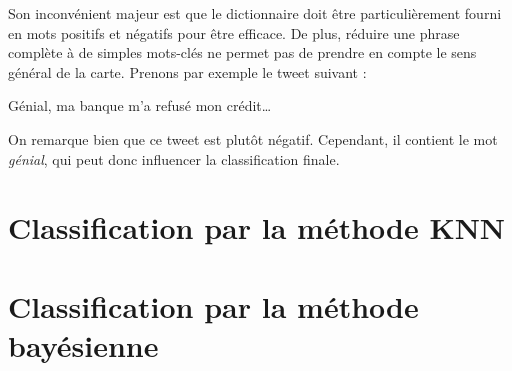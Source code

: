 \documentclass[12pt,a4paper]{report}
\begin{document}
Son inconvénient majeur est que le dictionnaire doit être particulièrement
fourni en mots positifs et négatifs pour être efficace. De plus, réduire une
phrase complète à de simples mots-clés ne permet pas de prendre en compte le
sens général de la carte. Prenons par exemple le tweet suivant :

Génial, ma banque m'a refusé mon crédit…

On remarque bien que ce tweet est plutôt négatif. Cependant, il contient le mot
\textit{génial}, qui peut donc influencer la classification finale.

\section{Classification par la méthode KNN}


\section{Classification par la méthode bayésienne}
\end{document}
